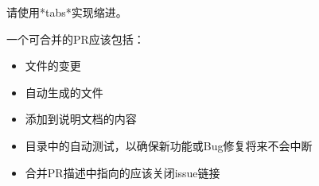 请使用*tabs*实现缩进。

一个可合并的PR应该包括：
\begin{itemize}
\item {}文件的变更
\item 自动生成的文件
\item 添加到说明文档的内容
\item {}目录中的自动测试，以确保新功能或Bug修复将来不会中断
\item 合并PR描述中指向的应该关闭issue链接
\end{itemize}
